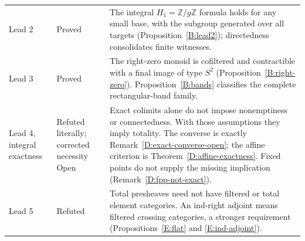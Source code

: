\begin{longtable}{@{}>{\raggedright\arraybackslash}p{}>{\raggedright\arraybackslash}p{}>{\raggedright\arraybackslash}p{}@{}}
\addlinespace
Lead 2 & Proved & The integral $H_1=\mathbb Z/g\mathbb Z$ formula holds for any small base, with the subgroup generated over all targets (Proposition~\ref{B:lead2}); directedness consolidates finite witnesses. \\
\addlinespace
Lead 3 & Proved & The right-zero monoid is cofiltered and contractible with a final image of type $S^2$ (Proposition~\ref{B:right-zero}). Proposition~\ref{B:bands} classifies the complete rectangular-band family. \\
\addlinespace
Lead 4, integral exactness & Refuted literally; corrected necessity Open & Exact colimits alone do not impose nonemptiness or connectedness. With those assumptions they imply totality. The converse is exactly Remark~\ref{D:exact-converse-open}; the affine criterion is Theorem~\ref{D:affine-exactness}. Fixed points do not supply the missing implication (Remark~\ref{D:fpp-not-exact}). \\
\addlinespace
Lead 5 & Refuted & Total presheaves need not have filtered or total element categories. An ind-right adjoint means filtered crossing categories, a stronger requirement (Propositions~\ref{E:flat} and \ref{E:ind-adjoint}). \\
\bottomrule
\end{longtable}
\normalsize

